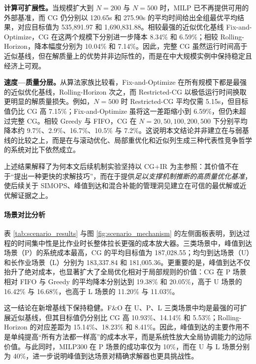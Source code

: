 \documentclass[UTF8, a4paper, 12pt]{ctexart}
\theoremstyle{plain}
\theoremstyle{definition}
\theoremstyle{remark}
\begin{document}
\textbf{计算可扩展性。}当规模扩大到 $N=200$ 与 $N=500$ 时，MILP 已不再提供可用的外部基准，而 CG 仍分别以 120.65s 和 275.90s 的平均时间给出全组最优平均结果，对应目标值为 535{,}891.97 和 1{,}690{,}831.88。相较最强的近似优化基线 Fix-and-Optimize，CG 在这两个规模下分别进一步降本 8.34\% 和 6.59\%；相较 Rolling-Horizon，降本幅度分别为 10.04\% 和 7.14\%。因此，完整 CG 虽然运行时间高于近似基线，但在解质量上的优势并非边际性的，而是在中大规模实例中保持稳定且经济上可观。

\textbf{速度—质量分层。}从算法家族比较看，Fix-and-Optimize 在所有规模下都是最强的近似优化基线，Rolling-Horizon 次之，而 Restricted-CG 以极低运行时间换取更明显的解质量损失。例如，$N=500$ 时 Restricted-CG 平均仅需 5.15s，但目标值仍比 CG 高 7.15\%；Fix-and-Optimize 虽将这一差距缩小到 6.59\%，但仍未超过完整 CG。相较 Greedy 与 FIFO，CG 在 $N=20,50,100,200,500$ 下分别平均降本约 9.7\%、2.9\%、16.7\%、10.5\% 与 7.2\%。这说明本文结论并非建立在与弱基线的比较之上，而是在与滚动优化、局部重优化和近似列生成三种代表性竞争哲学的系统对比下依然成立。

上述结果解释了为何本文后续机制实验坚持以 CG+IR 为主参照：其价值不在于“提出一种更快的求解技巧”，而在于提供\emph{足以支撑机制推断的高质量优化基准}，使后续关于 SIMOPS、峰值到达和混合补能的管理洞见建立在可信的最优解或近优解证据之上。

\begin{table}[htbp]
    \centering
    \caption{不同规模下各算法的总体对比结果（$N=100$ 行的 MILP300 为 300s 时限内 incumbent，$N>100$ 不再报告 MILP）}
    \label{tab:main_results}
    \scriptsize
    \setlength{\tabcolsep}{3pt}
    \renewcommand{\arraystretch}{1.08}
    \resizebox{\textwidth}{!}{}
\end{table}

\paragraph{场景对比分析}
表 \ref{tab:scenario_results} 与图 \ref{fig:scenario_mechanism} 的左侧面板表明，到达过程的时间集中性是比作业时长整体拉长更强的成本放大器。三类场景中，峰值到达场景（P）的系统成本最高，CG 的平均目标值为 187{,}028.55；均匀到达场景（U）和长作业场景（L）分别为 183{,}337.84 和 181{,}005.36。更重要的是，峰值到达不仅抬升了绝对成本，也显著扩大了全局优化相对于局部规则的价值：CG 在 P 场景相对 FIFO 与 Greedy 的平均降本分别达到 19.38\% 和 20.05\%，高于 U 场景的 16.42\% 与 16.68\%，也高于 L 场景的 11.20\% 与 11.03\%。

这一结论在新增基线下保持稳健。F\&O 在 U、P、L 三类场景中均是最强的可扩展近似基线，但其目标值仍分别比 CG 高 10.93\%、14.14\% 和 5.53\%；Rolling-Horizon 的对应差距为 15.14\%、18.23\% 和 8.41\%。因此，峰值到达的主要作用不是单纯提高“所有方法都一样高”的成本水平，而是系统性放大全局协调能力的边际价值。与此同时，MILP300 在 P 场景的成功率仅为 10\%，而在 U 与 L 场景分别为 40\%，进一步说明峰值到达场景对精确求解器也更具挑战性。
\end{document}
